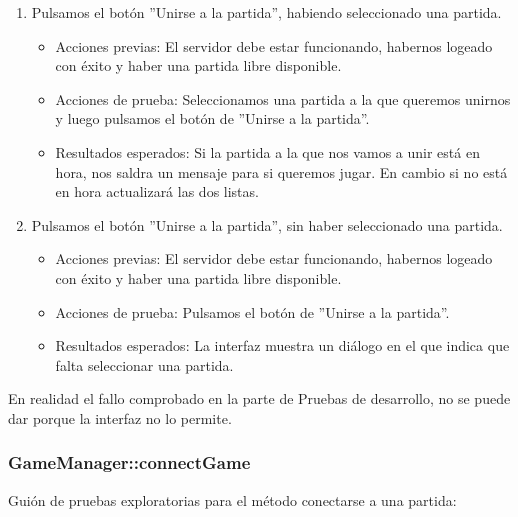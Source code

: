 \begin{enumerate}
\item Pulsamos el botón ''Unirse a la partida'', habiendo seleccionado una partida.
	\begin{itemize}
	\item Acciones previas: El servidor debe estar funcionando, habernos logeado con éxito y haber una partida libre disponible.
	\item Acciones de prueba: Seleccionamos una partida a la que queremos unirnos y luego pulsamos el botón de ''Unirse a la partida''.
	\item Resultados esperados: Si la partida a la que nos vamos a unir está en hora, nos saldra un mensaje para si queremos jugar. En cambio si no está en hora actualizará las dos listas.
	\end{itemize}
\item Pulsamos el botón ''Unirse a la partida'', sin haber seleccionado una partida.
	\begin{itemize}
	\item Acciones previas: El servidor debe estar funcionando, habernos logeado con éxito y haber una partida libre disponible.
	\item Acciones de prueba: Pulsamos el botón de ''Unirse a la partida''.
	\item Resultados esperados: La interfaz muestra un diálogo en el que indica que falta seleccionar una partida.
	\end{itemize}
\end{enumerate}

En realidad el fallo comprobado en la parte de Pruebas de desarrollo, no se puede dar porque la interfaz no lo permite.

\subsubsection{GameManager::connectGame}

Guión de pruebas exploratorias para el método conectarse a una partida:

